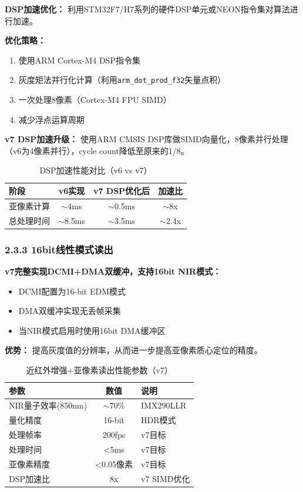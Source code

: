 \documentclass[12pt,a4paper]{article}
\begin{document}
\textbf{DSP加速优化：} 利用STM32F7/H7系列的硬件DSP单元或NEON指令集对算法进行加速。

\textbf{优化策略：}
\begin{enumerate}
\item 使用ARM Cortex-M4 DSP指令集
\item 灰度矩法并行化计算（利用\texttt{arm\_dot\_prod\_f32}矢量点积）
\item 一次处理8像素（Cortex-M4 FPU SIMD）
\item 减少浮点运算周期
\end{enumerate}

\textbf{v7 DSP加速升级：} 使用ARM CMSIS DSP库做SIMD向量化，8像素并行处理（v6为4像素并行），cycle count降低至原来的1/8。

\begin{table}[H]
\centering
\caption{DSP加速性能对比（v6 vs v7）}
\begin{tabular}{lccc}
\toprule
阶段 & v6实现 & v7 DSP优化后 & 加速比 \\
\midrule
亚像素计算 & $\sim$4ms & $\sim$0.5ms & $\sim$8x \\
总处理时间 & $\sim$8.5ms & $\sim$3.5ms & $\sim$2.4x \\
\bottomrule
\end{tabular}
\end{table}

\subsubsection{2.3.3 16bit线性模式读出}

\textbf{v7完整实现DCMI+DMA双缓冲，支持16bit NIR模式：}
\begin{itemize}
\item DCMI配置为16-bit EDM模式
\item DMA双缓冲实现无丢帧采集
\item 当NIR模式启用时使用16bit DMA缓冲区
\end{itemize}

\textbf{优势：} 提高灰度值的分辨率，从而进一步提高亚像素质心定位的精度。

\begin{table}[H]
\centering
\caption{近红外增强+亚像素读出性能参数（v7）}
\begin{tabular}{lcl}
\toprule
参数 & 数值 & 说明 \\
\midrule
NIR量子效率(850nm) & $\sim$70\% & IMX290LLR \\
量化精度 & 16-bit & HDR模式 \\
处理帧率 & 200fps & v7目标 \\
处理时间 & <5ms & v7目标 \\
亚像素精度 & <0.05像素 & v7目标 \\
DSP加速比 & 8x & v7 SIMD优化 \\
\bottomrule
\end{tabular}
\end{table}
\end{document}
